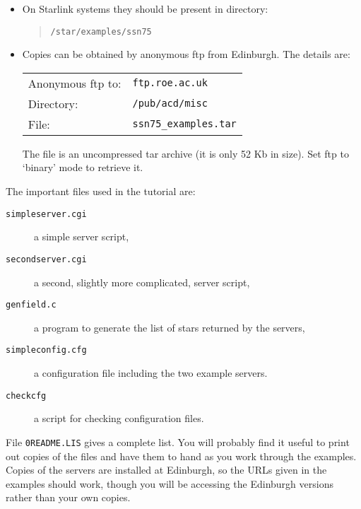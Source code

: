 \documentclass[twoside,11pt,nolof,chapters]{starlink}
\begin{document}
\begin{itemize}

  \item On Starlink systems they should be present in directory:

  \begin{quote}
   \texttt{/star/examples/ssn75}
  \end{quote}

  \item Copies can be obtained by anonymous ftp from Edinburgh.  The
   details are:

  \begin{tabular}{ll}
   Anonymous ftp to: & \texttt{ftp.roe.ac.uk}    \\
   Directory:        & \texttt{/pub/acd/misc}    \\
   File:             & \texttt{ssn75\_examples.tar} \\
  \end{tabular}

   The file is an uncompressed tar archive (it is only 52 Kb in size).
   Set ftp to `binary' mode to retrieve it.

\end{itemize}

The important files used in the tutorial are:

\begin{description}

  \item[\texttt{simpleserver.cgi}] a simple server script,

  \item[\texttt{secondserver.cgi}] a second, slightly more complicated, server
   script,

  \item[\texttt{genfield.c}] a program to generate the list of stars returned
   by the servers,

  \item[\texttt{simpleconfig.cfg}] a configuration file including the two
   example servers.

  \item[\texttt{checkcfg}] a script for checking configuration files.

\end{description}

File \texttt{0README.LIS} gives a complete list.  You will probably find it
useful to print out copies of the files and have them to hand as you work
through the examples.  Copies of the servers are installed at Edinburgh, so
the URLs given in the examples should work, though you will be accessing
the Edinburgh versions rather than your own copies.
\end{document}
